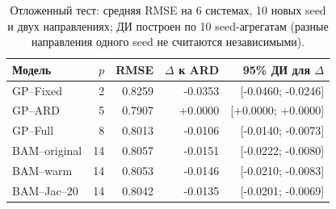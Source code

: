 \begin{table}[htbp]\centering\small
\caption{Отложенный тест: средняя RMSE на 6 системах, 10 новых seed и двух направлениях; ДИ построен по 10 seed-агрегатам (разные направления одного seed не считаются независимыми).}
\label{tab:metric-main}
\begin{tabular}{lrrrr}
\toprule
Модель & $p$ & RMSE & $\Delta$ к ARD & 95\% ДИ для $\Delta$ \\
\midrule
GP--Fixed & 2 & 0.8259 & -0.0353 & [-0.0460; -0.0246] \\
GP--ARD & 5 & 0.7907 & +0.0000 & [+0.0000; +0.0000] \\
GP--Full & 8 & 0.8013 & -0.0106 & [-0.0140; -0.0073] \\
BAM--original & 14 & 0.8057 & -0.0151 & [-0.0222; -0.0080] \\
BAM--warm & 14 & 0.8053 & -0.0146 & [-0.0210; -0.0083] \\
BAM--Jac--20 & 14 & 0.8042 & -0.0135 & [-0.0201; -0.0069] \\
\bottomrule
\end{tabular}
\end{table}
